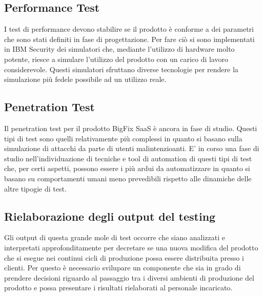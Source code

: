 \subsection{Performance Test}
I test di performance devono stabilire se il prodotto è conforme a dei parametri che sono stati definiti in fase di progettazione. Per fare ciò si sono implementati in IBM Security dei simulatori che, mediante l'utilizzo di hardware molto potente, riesce a simulare l'utilizzo del prodotto con un carico di lavoro considerevole. Questi simulatori sfruttano diverse tecnologie per rendere la simulazione più fedele possibile ad un utilizzo reale.

\subsection{Penetration Test}
Il penetration test per il prodotto BigFix SaaS è ancora in fase di studio. Questi tipi di test sono quelli relativamente più complessi in quanto si basano sulla simulazione di attacchi da parte di utenti malintenzioanti. E' in corso una fase di studio nell'individuazione di tecniche e tool di automation di questi tipi di test che, per certi aspetti, possono essere i più ardui da automatizzare in quanto si basano su comportamenti umani meno prevedibili rispetto alle dinamiche delle altre tipogie di test.

\subsection{Rielaborazione degli output del testing}
Gli output di questa grande mole di test occorre che siano analizzati e interpretati approfonditamente per decretare se una nuova modifica del prodotto che si esegue nei continui cicli di produzione possa essere distribuita presso i clienti. Per questo è necessario svilupare un componente che sia in grado di prendere decisioni riguardo al passaggio tra i diversi ambienti di produzione del prodotto e possa presentare i risultati rielaborati al personale incaricato.

